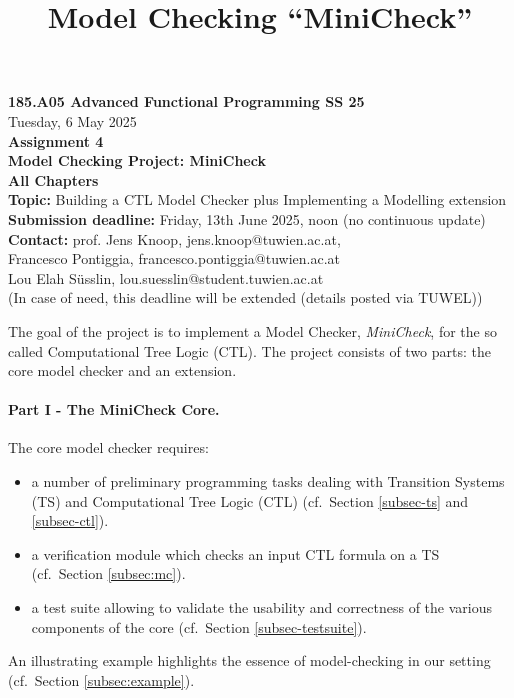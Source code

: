 \documentclass{article}
\title{Model Checking ``MiniCheck''}
\begin{document}
\large
\begin{center}
  {\Large \textbf{185.A05 Advanced Functional Programming SS 25}}  \\ [1ex] 
            Tuesday, 6 May 2025 \\
               {\Large \textbf{Assignment 4}} \\[.5ex]
              {\Large \textbf{Model Checking Project: MiniCheck}} \\[.5ex]
                 \textbf{All Chapters}  \\ [.75ex]
           \textbf{Topic:} Building a CTL Model Checker plus Implementing a Modelling extension \\[1ex]
          \textbf{Submission deadline:} Friday, 13th June 2025, noon (no continuous update)  \\ [0.5ex]
          \textbf{Contact:} prof. Jens Knoop, jens.knoop@tuwien.ac.at, \\
                            Francesco Pontiggia, francesco.pontiggia@tuwien.ac.at \\
                            Lou Elah Süsslin, lou.suesslin@student.tuwien.ac.at \\
                     (In case of need, this deadline will be extended (details posted via TUWEL))
\end{center}

\vspace{1ex}
\noindent
\noindent

\newcommand{\code}[1]{\texttt{#1}}

\noindent
The goal of the project is to implement a  Model Checker, \textit{MiniCheck}, 
for the so called Computational Tree Logic (CTL). 
The project consists of two parts: the core model checker and an extension. 

\paragraph{Part I - The MiniCheck Core.} The core model checker requires: 
\begin{itemize}
    \item a number of preliminary programming tasks dealing with Transition Systems (TS)
          and Computational Tree Logic (CTL) (cf.~Section \ref{subsec-ts} and \ref{subsec-ctl}).
    \item a verification module which checks an input CTL formula on a TS (cf.~Section \ref{subsec:mc}).
    \item a test suite allowing to validate the usability and correctness of the
          various components of the core (cf.~Section \ref{subsec-testsuite}).
\end{itemize}  
An illustrating example highlights the essence of model-checking in our setting (cf.~Section \ref{subsec:example}). 
\end{document}
